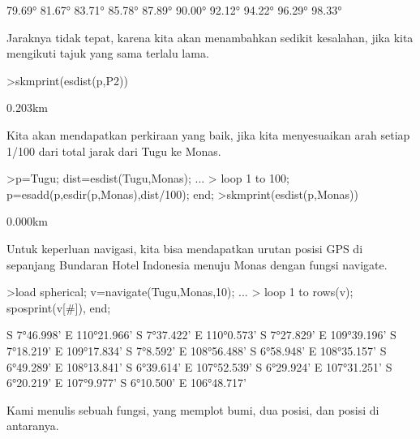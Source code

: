 \documentclass[12pt,arial,letterpaper]{book}
\begin{document}
\begin{eulernootebook}
\begin{eulercomment}
\begin{eulercomment}
\begin{eulernootebook}
\begin{eulercomment}
\begin{eulercomment}
\begin{eulercomment}
\begin{eulercomment}
\begin{eulercomment}
\begin{eulercomment}
\begin{eulernotebook}
\begin{eulercomment}
\begin{eulercomment}
\begin{eulercomment}
\begin{eulercomment}
\begin{eulercomment}
\begin{eulercomment}
\begin{eulerprompt}
\end{eulerprompt}
\begin{euleroutput}
       79.69°
       81.67°
       83.71°
       85.78°
       87.89°
       90.00°
       92.12°
       94.22°
       96.29°
       98.33°
\end{euleroutput}
\begin{eulercomment}
Jaraknya tidak tepat, karena kita akan menambahkan sedikit kesalahan,
jika kita mengikuti tajuk yang sama terlalu lama.
\end{eulercomment}
\begin{eulerprompt}
>skmprint(esdist(p,P2))
\end{eulerprompt}
\begin{euleroutput}
       0.203km
\end{euleroutput}
\begin{eulercomment}
Kita akan mendapatkan perkiraan yang baik, jika kita menyesuaikan arah
setiap 1/100 dari total jarak dari Tugu ke Monas.
\end{eulercomment}
\begin{eulerprompt}
>p=Tugu; dist=esdist(Tugu,Monas); ...
>  loop 1 to 100; p=esadd(p,esdir(p,Monas),dist/100); end;
>skmprint(esdist(p,Monas))
\end{eulerprompt}
\begin{euleroutput}
       0.000km
\end{euleroutput}
\begin{eulercomment}
Untuk keperluan navigasi, kita bisa mendapatkan urutan posisi GPS di
sepanjang Bundaran Hotel Indonesia menuju Monas dengan fungsi
navigate.
\end{eulercomment}
\begin{eulerprompt}
>load spherical; v=navigate(Tugu,Monas,10); ...
>  loop 1 to rows(v); sposprint(v[#]), end;
\end{eulerprompt}
\begin{euleroutput}
  S 7°46.998' E 110°21.966'
  S 7°37.422' E 110°0.573'
  S 7°27.829' E 109°39.196'
  S 7°18.219' E 109°17.834'
  S 7°8.592' E 108°56.488'
  S 6°58.948' E 108°35.157'
  S 6°49.289' E 108°13.841'
  S 6°39.614' E 107°52.539'
  S 6°29.924' E 107°31.251'
  S 6°20.219' E 107°9.977'
  S 6°10.500' E 106°48.717'
\end{euleroutput}
\begin{eulercomment}
Kami menulis sebuah fungsi, yang memplot bumi, dua posisi, dan posisi
di antaranya.
\end{eulercomment}
\begin{eulerprompt}

\end{eulerprompt}
\end{eulercomment}
\end{eulercomment}
\end{eulercomment}
\end{eulercomment}
\end{eulercomment}
\end{eulercomment}
\end{eulernotebook}
\end{eulercomment}
\end{eulercomment}
\end{eulercomment}
\end{eulercomment}
\end{eulercomment}
\end{eulercomment}
\end{eulernootebook}
\end{eulercomment}
\end{eulercomment}
\end{eulernootebook}
\end{document}
